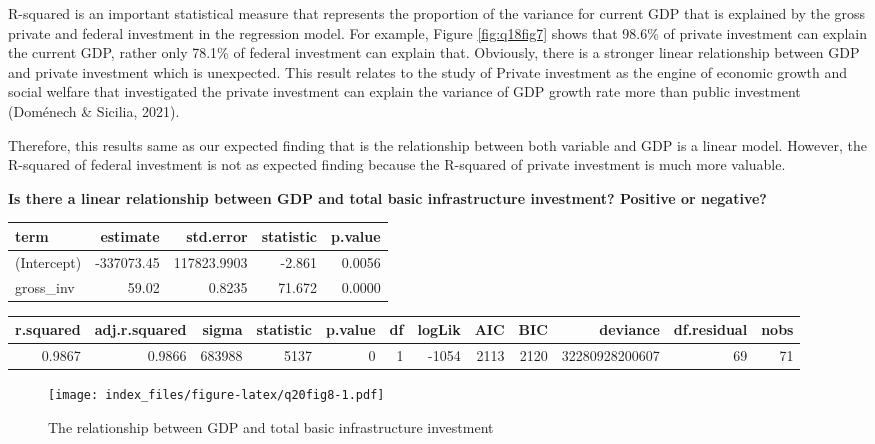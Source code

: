 \documentclass[
]{article}
\begin{document}
R-squared is an important statistical measure that represents the proportion of the variance for current GDP that is explained by the gross private and federal investment in the regression model. For example, Figure \ref{fig:q18fig7} shows that 98.6\% of private investment can explain the current GDP, rather only 78.1\% of federal investment can explain that. Obviously, there is a stronger linear relationship between GDP and private investment which is unexpected. This result relates to the study of Private investment as the engine of economic growth and social welfare that investigated the private investment can explain the variance of GDP growth rate more than public investment (Doménech \& Sicilia, 2021).

Therefore, this results same as our expected finding that is the relationship between both variable and GDP is a linear model. However, the R-squared of federal investment is not as expected finding because the R-squared of private investment is much more valuable.

\textbf{Is there a linear relationship between GDP and total basic infrastructure investment? Positive or negative?}

\begin{table}
\centering
\begin{tabular}{l|r|r|r|r}
\hline
term & estimate & std.error & statistic & p.value\\
\hline
(Intercept) & -337073.45 & 117823.9903 & -2.861 & 0.0056\\
\hline
gross\_inv & 59.02 & 0.8235 & 71.672 & 0.0000\\
\hline
\end{tabular}
\end{table}

\begin{table}
\centering
\begin{tabular}{r|r|r|r|r|r|r|r|r|r|r|r}
\hline
r.squared & adj.r.squared & sigma & statistic & p.value & df & logLik & AIC & BIC & deviance & df.residual & nobs\\
\hline
0.9867 & 0.9866 & 683988 & 5137 & 0 & 1 & -1054 & 2113 & 2120 & 32280928200607 & 69 & 71\\
\hline
\end{tabular}
\end{table}

\begin{figure}
\centering
\texttt{[image: index\_files/figure-latex/q20fig8-1.pdf]}
\caption{\label{fig:q20fig8}The relationship between GDP and total basic infrastructure investment}
\end{figure}
\end{document}
